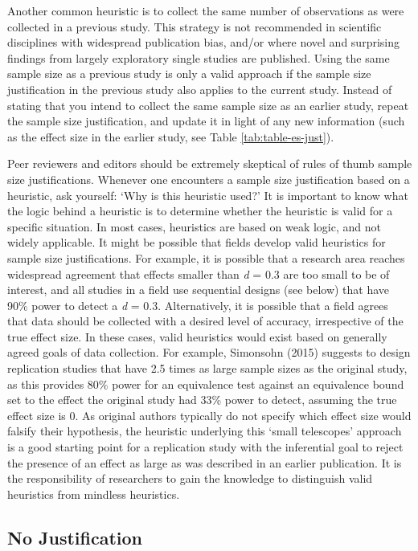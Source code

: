\documentclass[
  english,
  ,jou, a4paper,floatsintext]{apa6}
\begin{document}
Another common heuristic is to collect the same number of observations as were collected in a previous study. This strategy is not recommended in scientific disciplines with widespread publication bias, and/or where novel and surprising findings from largely exploratory single studies are published. Using the same sample size as a previous study is only a valid approach if the sample size justification in the previous study also applies to the current study. Instead of stating that you intend to collect the same sample size as an earlier study, repeat the sample size justification, and update it in light of any new information (such as the effect size in the earlier study, see Table \ref{tab:table-es-just}).

Peer reviewers and editors should be extremely skeptical of rules of thumb sample size justifications. Whenever one encounters a sample size justification based on a heuristic, ask yourself: `Why is this heuristic used?' It is important to know what the logic behind a heuristic is to determine whether the heuristic is valid for a specific situation. In most cases, heuristics are based on weak logic, and not widely applicable. It might be possible that fields develop valid heuristics for sample size justifications. For example, it is possible that a research area reaches widespread agreement that effects smaller than \emph{d} = 0.3 are too small to be of interest, and all studies in a field use sequential designs (see below) that have 90\% power to detect a \emph{d} = 0.3. Alternatively, it is possible that a field agrees that data should be collected with a desired level of accuracy, irrespective of the true effect size. In these cases, valid heuristics would exist based on generally agreed goals of data collection. For example, Simonsohn (2015) suggests to design replication studies that have 2.5 times as large sample sizes as the original study, as this provides 80\% power for an equivalence test against an equivalence bound set to the effect the original study had 33\% power to detect, assuming the true effect size is 0. As original authors typically do not specify which effect size would falsify their hypothesis, the heuristic underlying this `small telescopes' approach is a good starting point for a replication study with the inferential goal to reject the presence of an effect as large as was described in an earlier publication. It is the responsibility of researchers to gain the knowledge to distinguish valid heuristics from mindless heuristics.

\hypertarget{no-justification}{%
\subsection{No Justification}\label{no-justification}}
\end{document}
